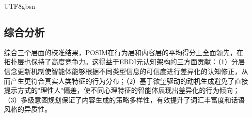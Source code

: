 \documentclass[11pt]{article}
\begin{document}
\begin{CJK}{UTF8}{gbsn}
\subsection{综合分析}

综合三个层面的校准结果，POSIM在行为层和内容层的平均得分上全面领先，在拓扑层也保持了高度竞争力。这得益于EBDI元认知架构的三方面贡献：（1）分层信念更新机制使智能体能够根据不同类型信息的可信度进行差异化的认知修正，从而产生更符合真实人类特征的行为分布；（2）基于欲望驱动的动机生成避免了直接提示方式的"理性人"偏差，使不同心理特征的智能体展现出差异化的行为倾向；（3）多级意图规划保证了内容生成的策略多样性，有效提升了词汇丰富度和话语风格的异质性。

\end{CJK}
\end{document}
